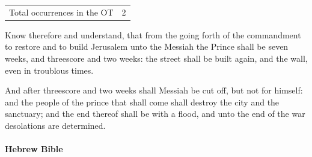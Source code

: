 			\begin{tabular}{ll}
				Total occurrences in the OT & 2
			\end{tabular}
			
			\begin{compactdesc}
				\item[Daniel 9:25] Know therefore and understand, that from the going forth of the commandment to restore and to build Jerusalem unto the Messiah the Prince shall be seven weeks, and threescore and two weeks: the street shall be built again, and the wall, even in troublous times.
				\item[Daniel 9:26] And after threescore and two weeks shall Messiah be cut off, but not for himself: and the people of the prince that shall come shall destroy the city and the sanctuary; and the end thereof shall be with a flood, and unto the end of the war desolations are determined.
			\end{compactdesc}
			
		\paragraph{Hebrew Bible}
			\label{MESSIAH-HEBREW}
		
			\subparagraph{\texorpdfstring{}{}}
				\label{MASHIACH} %
			
